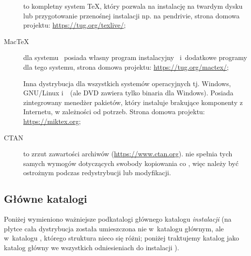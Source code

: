 \documentclass{article}
\begin{document}
\begin{description}

\item [\TL] to kompletny system \TeX, który pozwala na instalację na
twardym dysku lub przygotowanie przenośnej instalacji np. na pendrivie,
strona domowa projektu: \url{https://tug.org/texlive/};

\item [Mac\TeX] dla systemu \macOS\  posiada własny program instalacyjny \macOS\  
i~dodatkowe programy dla tego systemu, strona domowa projektu:
\url{https://tug.org/mactex/};
\item [\MIKTEX] Inna dystrybucja dla wszystkich systemów operacyjnych tj. Windows, GNU/Linux i~\macOS\ (ale DVD zawiera tylko binaria dla  Windows). Posiada zintegrowany menedżer pakietów, który instaluje brakujące komponenty z Internetu, w zależności od potrzeb.  
Strona domowa projektu: \url{https://miktex.org};

\item [CTAN] to zrzut zawartości archiwów \CTAN{} (\url{https://www.ctan.org}). \CTAN\/ nie spełnia tych samych wymogów dotyczących swobody kopiowania co \TL{}, więc należy być
ostrożnym podczas redystrybucji lub modyfikacji.

\end{description}

\subsection{Główne katalogi \protect\TL}
\label{sec:tld}

Poniżej wymieniono ważniejsze podkatalogi głównego katalogu \emph{instalacji}
\TL (na płytce \TK{} \DVD{} cała dystrybucja \TL{} została umieszczona nie
w~katalogu głównym, ale w~katalogu , którego struktura nieco
się różni; poniżej traktujemy katalog \dirname{texlive} jako katalog główny
we wszystkich odniesieniach do instalacji \TL).
\end{document}
